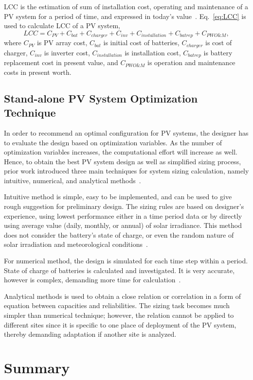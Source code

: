 LCC is the estimation of sum of installation cost, operating and maintenance of a PV system for a period of time, and expressed in today's value~\cite{Applasamy2011}. Eq.~\eqref{eq:LCC} is used to calculate LCC of a PV system,
%
\begin{equation}
\label{eq:LCC}
LCC = C_{PV} + C_{bat} + C_{charger} + C_{inv} + C_{installation} + C_{batrep} + C_{PWO\&M},
\end{equation}
\noindent where $C_{PV}$ is PV array cost, $C_{bat}$ is initial cost of batteries, $C_{charger}$ is cost of charger, $C_{inv}$ is inverter cost, $C_{installation}$ is installation cost, $C_{batrep}$ is battery replacement cost in present value, and $C_{PWO\&M}$ is operation and maintenance costs 
in present worth.

\subsection{Stand-alone PV System Optimization Technique}

In order to recommend an optimal configuration for PV systems, 
the designer has to evaluate the design based on optimization variables. 
As the number of optimization variables increases, the computational effort 
will increase as well. Hence, to obtain the best PV system design as well as 
simplified sizing process, prior work introduced three main techniques 
for system sizing calculation, namely intuitive, numerical, and analytical methods~\cite{Zhou2010}.

Intuitive method is simple, easy to be implemented, and can be used to give 
rough suggestion for preliminary design. The sizing rules are based on designer's experience, 
using lowest performance either in a time period data or by directly using average value 
(daily, monthly, or annual) of solar irradiance. This method does not consider the battery's 
state of charge, or even the random nature of solar irradiation and meteorological conditions~\cite{Alsadi2018}.

For numerical method, the design is simulated for each time step within a period. 
State of charge of batteries is calculated and investigated. It is very accurate, 
however is complex, demanding more time for calculation~\cite{Park2004}.

Analytical methods is used to obtain a close relation or correlation in a form 
of equation between capacities and reliabilities. The sizing task becomes much simpler 
than numerical technique; however, the relation cannot be applied to different sites
since it is specific to one place of deployment of the PV system, 
thereby demanding adaptation if another site is analyzed.

\section{Summary}
